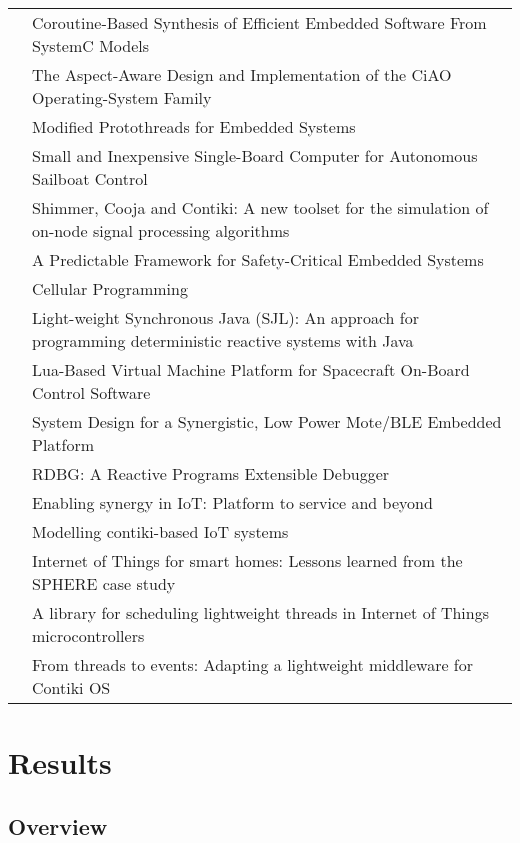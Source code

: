 \begin{longtable}[c]{ l p{8cm} }
\cite{Liu2011} & Coroutine-Based Synthesis of Efficient Embedded Software From SystemC Models \\
\cite{Lohmann2012} & The Aspect-Aware Design and Implementation of the CiAO Operating-System Family \\
\cite{Schimpf2012b} & Modified Protothreads for Embedded Systems \\
\cite{Alvira2013} & Small and Inexpensive Single-Board Computer for Autonomous Sailboat Control \\
\cite{Kugler2013} & Shimmer, Cooja and Contiki: A new toolset for the simulation of on-node signal processing algorithms \\
\cite{Andalam2014} & A Predictable Framework for Safety-Critical Embedded Systems \\
\cite{Niebert2014} & Cellular Programming \\
\cite{Motika2015} & Light-weight Synchronous Java (SJL): An approach for programming deterministic reactive systems with Java \\
\cite{Park2015} & Lua-Based Virtual Machine Platform for Spacecraft On-Board Control Software \\
\cite{Andersen2016} & System Design for a Synergistic, Low Power Mote/BLE Embedded Platform \\
\cite{Jahier2016} & RDBG: A Reactive Programs Extensible Debugger \\
\cite{Andersen2017b} & Enabling synergy in IoT: Platform to service and beyond \\
\cite{Durmaz2017} & Modelling contiki-based IoT systems \\
\cite{Elsts2017} & Internet of Things for smart homes: Lessons learned from the SPHERE case study \\
\cite{Kalebe2017} & A library for scheduling lightweight threads in Internet of Things microcontrollers \\
\cite{Noman2017} & From threads to events: Adapting a lightweight middleware for Contiki OS \\
\hline
\end{longtable}

\fi

\section{Results}
\label{section:results}

\subsection{Overview}

